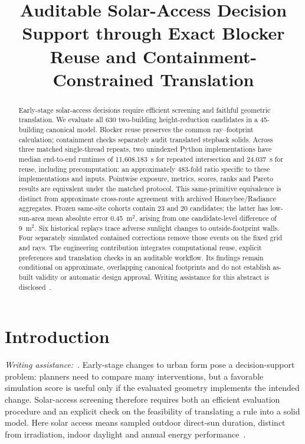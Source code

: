 \documentclass{llncs}
\newcommand{\aidraft}{\textit{Writing assistance:}~\cite{openai2026}. }
\begin{document}
\title{Auditable Solar-Access Decision Support through Exact Blocker Reuse and Containment-Constrained Translation}
\author{}
\institute{}
\maketitle
\begin{abstract}
Early-stage solar-access decisions require efficient screening and faithful geometric translation. We evaluate all 630 two-building height-reduction candidates in a 45-building canonical model. Blocker reuse preserves the common ray--footprint calculation; containment checks separately audit translated stepback solids. Across three matched single-thread repeats, two unindexed Python implementations have median end-to-end runtimes of 11,608.183~s for repeated intersection and 24.037~s for reuse, including precomputation: an approximately 483-fold ratio specific to these implementations and inputs. Pointwise exposure, metrics, scores, ranks and Pareto results are equivalent under the matched protocol. This same-primitive equivalence is distinct from approximate cross-route agreement with archived Honeybee/Radiance aggregates. Frozen same-site cohorts contain 23 and 20 candidates; the latter has low-sun-area mean absolute error 0.45~m$^2$, arising from one candidate-level difference of 9~m$^2$. Six historical replays trace adverse sunlight changes to outside-footprint walls. Four separately simulated contained corrections remove those events on the fixed grid and rays. The engineering contribution integrates computational reuse, explicit preferences and translation checks in an auditable workflow. Its findings remain conditional on approximate, overlapping canonical footprints and do not establish as-built validity or automatic design approval. Writing assistance for this abstract is disclosed~\cite{openai2026}.
\end{abstract}

\section{Introduction}
\aidraft{}Early-stage changes to urban form pose a decision-support problem: planners need to compare many interventions, but a favorable simulation score is useful only if the evaluated geometry implements the intended change. Solar-access screening therefore requires both an efficient evaluation procedure and an explicit check on the feasibility of translating a rule into a solid model. Here solar access means sampled outdoor direct-sun duration, distinct from irradiation, indoor daylight and annual energy performance~\cite{compagnon2004urban,czachura2022metrics}.
\end{document}
